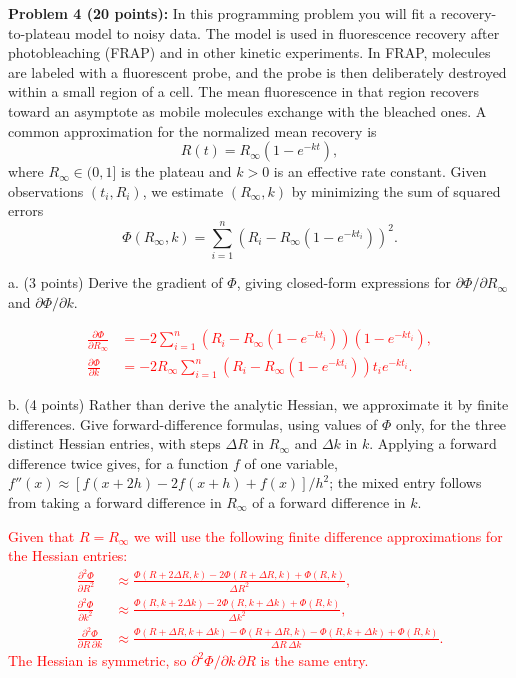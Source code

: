 \documentclass[11pt]{article}
\begin{document}
\vspace{0.5em}
{\bf Problem 4 (20 points):} In this programming problem you will fit a recovery-to-plateau
model to noisy data. The model is used in fluorescence recovery after photobleaching (FRAP) and
in other kinetic experiments. In FRAP, molecules are labeled with a fluorescent probe, and the probe is then
deliberately destroyed within a small region of a cell. The mean fluorescence in that region
recovers toward an asymptote as mobile molecules exchange with the bleached ones. A common
approximation for the normalized mean recovery is
\[
R(t)=R_\infty\left(1-e^{-kt}\right),
\]
where $R_\infty\in(0,1]$ is the plateau and $k>0$ is an effective rate constant. Given
observations $(t_i,R_i)$, we estimate $(R_\infty,k)$ by minimizing the sum of squared errors
\[
\Phi(R_\infty,k)=\sum_{i=1}^n\left(R_i-R_\infty\left(1-e^{-kt_i}\right)\right)^2.
\]

a. (3 points) Derive the gradient of $\Phi$, giving closed-form expressions for
$\partial\Phi/\partial R_\infty$ and $\partial\Phi/\partial k$.

\textcolor{red}{
\begin{align*}
\frac{\partial\Phi}{\partial R_\infty} &= -2\sum_{i=1}^n \left(R_i - R_\infty(1 - e^{-kt_i})\right)\left(1 - e^{-kt_i}\right), \\
\frac{\partial\Phi}{\partial k} &= -2R_\infty\sum_{i=1}^n \left(R_i - R_\infty(1 - e^{-kt_i})\right) t_i e^{-kt_i}.
\end{align*}
}

b. (4 points) Rather than derive the analytic Hessian, we approximate it by finite differences.
Give forward-difference formulas, using values of $\Phi$ only, for the three distinct Hessian
entries, with steps $\Delta R$ in $R_\infty$ and $\Delta k$ in $k$. Applying a forward
difference twice gives, for a function $f$ of one variable,
$f''(x)\approx[f(x+2h)-2f(x+h)+f(x)]/h^2$; the mixed entry follows from taking a forward
difference in $R_\infty$ of a forward difference in $k$.

\textcolor{red}{
Given that $R = R_\infty$ we will use the following finite difference approximations for the Hessian entries:
\begin{align*}
\frac{\partial^2\Phi}{\partial R^2} &\approx \frac{\Phi(R + 2\Delta R, k) - 2\Phi(R + \Delta R, k) + \Phi(R, k)}{\Delta R^2}, \\
\frac{\partial^2\Phi}{\partial k^2} &\approx \frac{\Phi(R, k + 2\Delta k) - 2\Phi(R, k + \Delta k) + \Phi(R, k)}{\Delta k^2}, \\
\frac{\partial^2\Phi}{\partial R\,\partial k} &\approx \frac{\Phi(R + \Delta R, k + \Delta k) - \Phi(R + \Delta R, k) - \Phi(R, k + \Delta k) + \Phi(R, k)}{\Delta R\,\Delta k}.
\end{align*}
The Hessian is symmetric, so $\partial^2\Phi/\partial k\,\partial R$ is the same entry.
}
\end{document}
